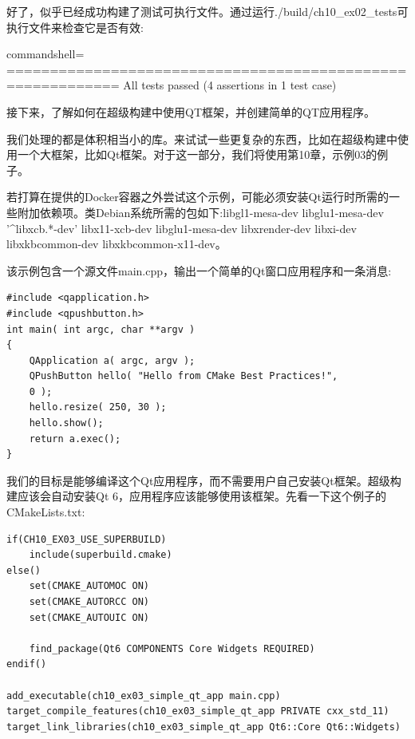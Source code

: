 好了，似乎已经成功构建了测试可执行文件。通过运行./build/ch10\_ex02\_tests可执行文件来检查它是否有效:

\begin{tcblisting}{commandshell={}}
===========================================================
All tests passed (4 assertions in 1 test case)
\end{tcblisting}

接下来，了解如何在超级构建中使用QT框架，并创建简单的QT应用程序。


我们处理的都是体积相当小的库。来试试一些更复杂的东西，比如在超级构建中使用一个大框架，比如Qt框架。对于这一部分，我们将使用第10章，示例03的例子。

\begin{tcolorbox}[colback=yellow!5!white,colframe=yellow!75!black,title=重要的Note]
若打算在提供的Docker容器之外尝试这个示例，可能必须安装Qt运行时所需的一些附加依赖项。类Debian系统所需的包如下:libgl1-mesa-dev libglu1-mesa-dev '\^{}libxcb.*-dev' libx11-xcb-dev libglu1-mesa-dev libxrender-dev libxi-dev libxkbcommon-dev libxkbcommon-x11-dev。
\end{tcolorbox}

该示例包含一个源文件main.cpp，输出一个简单的Qt窗口应用程序和一条消息:

\begin{lstlisting}[style=styleCXX]
#include <qapplication.h>
#include <qpushbutton.h>
int main( int argc, char **argv )
{
	QApplication a( argc, argv );
	QPushButton hello( "Hello from CMake Best Practices!",
	0 );
	hello.resize( 250, 30 );
	hello.show();
	return a.exec();
}
\end{lstlisting}

我们的目标是能够编译这个Qt应用程序，而不需要用户自己安装Qt框架。超级构建应该会自动安装Qt 6，应用程序应该能够使用该框架。先看一下这个例子的CMakeLists.txt:

\begin{lstlisting}[style=styleCMake]
if(CH10_EX03_USE_SUPERBUILD)
	include(superbuild.cmake)
else()
	set(CMAKE_AUTOMOC ON)
	set(CMAKE_AUTORCC ON)
	set(CMAKE_AUTOUIC ON)

	find_package(Qt6 COMPONENTS Core Widgets REQUIRED)
endif()

add_executable(ch10_ex03_simple_qt_app main.cpp)
target_compile_features(ch10_ex03_simple_qt_app PRIVATE cxx_std_11)
target_link_libraries(ch10_ex03_simple_qt_app Qt6::Core Qt6::Widgets)
\end{lstlisting}

